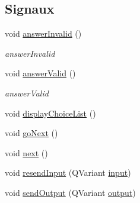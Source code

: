 \subsection*{Signaux}
\begin{DoxyCompactItemize}
\item 
void \hyperlink{classSimpleHotel_1_1SH__QuestionState_a69caaa66c68de820a5afa9584f24ca31}{answer\-Invalid} ()
\begin{DoxyCompactList}\small\item\em answer\-Invalid \end{DoxyCompactList}\item 
void \hyperlink{classSimpleHotel_1_1SH__QuestionState_ad69b23cffd57936805e7b66483c5c951}{answer\-Valid} ()
\begin{DoxyCompactList}\small\item\em answer\-Valid \end{DoxyCompactList}\item 
void \hyperlink{classSimpleHotel_1_1SH__DatabaseContentQuestionState_a56e191f78b42803aa53e275023576a63}{display\-Choice\-List} ()
\item 
void \hyperlink{classSimpleHotel_1_1SH__GenericState_a5afea8cc17017b08b8db6d51b5bcefc4}{go\-Next} ()
\item 
void \hyperlink{classSimpleHotel_1_1SH__GenericState_a0ff6668857baab63d4f13c4d7175acbd}{next} ()
\item 
void \hyperlink{classSimpleHotel_1_1SH__InOutState_ab259648430e9e6e0667e79398c68c0d9}{resend\-Input} (Q\-Variant \hyperlink{classSimpleHotel_1_1SH__InOutState_a487d2ca6200fed372b1a27cfa27774db}{input})
\item 
void \hyperlink{classSimpleHotel_1_1SH__InOutState_a6f39ba3a9682ece4a0d2c96e8f8983a0}{send\-Output} (Q\-Variant \hyperlink{classSimpleHotel_1_1SH__InOutState_a71b15e4d49b9c2aa540500065ceb39da}{output})
\end{DoxyCompactItemize}
